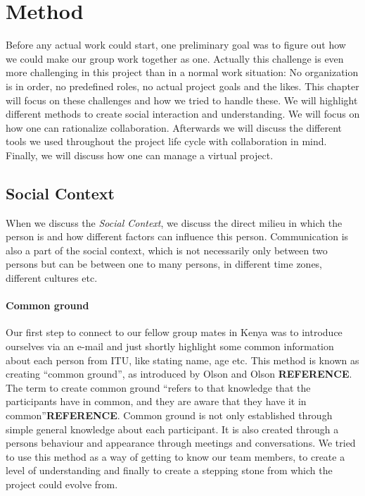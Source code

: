 \section{Method}
Before any actual work could start, one preliminary goal was to figure out how we could make our group work together as one. Actually this challenge is even more challenging in this project than in a normal work situation: No organization is in order, no predefined roles, no actual project goals and the likes. This chapter will focus on these challenges and how we tried to handle these. We will highlight different methods to create social interaction and understanding. We will focus on how one can rationalize collaboration. Afterwards we will discuss the different tools we used throughout the project life cycle with collaboration in mind. Finally, we will discuss how one can manage a virtual project.\\

\subsection{Social Context}
When we discuss the \textit{Social Context}, we discuss the direct milieu in which the person is and how different factors can influence this person. Communication is also a part of the social context, which is not necessarily only between two persons but can be between one to many persons, in different time zones, different cultures etc.\\
\paragraph{Common ground}
Our first step to connect to our fellow group mates in Kenya was to introduce ourselves via an e-mail and just shortly highlight some common information about each person from ITU, like stating name, age etc. This method is known as creating ``common ground'', as introduced by Olson and Olson \textbf{REFERENCE}. The term to create common ground ``refers to that knowledge that the participants have in common, and they are aware that they have it in common''\textbf{REFERENCE}. Common ground is not only established through simple general knowledge about each participant. It is also created through a persons behaviour and appearance through meetings and conversations. We tried to use this method as a way of getting to know our team members, to create a level of understanding and finally to create a stepping stone from which the project could evolve from.

